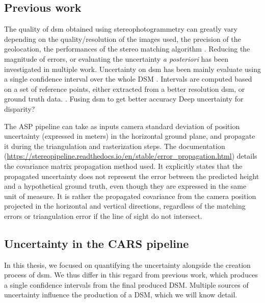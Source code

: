 \subsection{Previous work}

The quality of \acrshort{dsm} obtained using stereophotogrammetry can greatly vary depending on the quality/resolution of the images used, the precision of the geolocation, the performances of the stereo matching algorithm \etc. Reducing the magnitude of errors, or evaluating the uncertainty \textit{a posteriori} has been investigated in multiple work.
Uncertainty on \acrshort{dsm} has been mainly evaluate using a single confidence interval over the whole DSM \cite{hugonnet_uncertainty_2022, deschamps-berger_apport_2021, wang_robust_2015, oksanen_digital_2006,panagiotakis_validation_2018}. Intervals are computed based on a set of reference points, either extracted from a better resolution \acrshort{dsm}, or ground truth data. . Fusing \acrshort{dsm} to get better accuracy \cite{qin_uncertainty-guided_2022}
\cite{hu_quantitative_2012,poggi_confidence_2021}
Deep uncertainty for disparity?

The ASP pipeline can take as inputs camera standard deviation of position uncertainty (expressed in meters) in the horizontal ground plane, and propagate it during the triangulation and rasterization steps. The documentation (\url{https://stereopipeline.readthedocs.io/en/stable/error_propagation.html}) details the covariance matrix propagation method used. It explicitly states that the propagated uncertainty does not represent the error between the predicted height and a hypothetical ground truth, even though they are expressed in the same unit of measure. It is rather the propagated covariance from the camera position projected in the horizontal and vertical directions, regardless of the matching errors or triangulation error if the line of sight do not intersect.

\subsection{Uncertainty in the CARS pipeline}\label{sec:uncertainty_cars}
In this thesis, we focused on quantifying the uncertainty alongside the creation process of \acrshort{dsm}. We thus differ in this regard from previous work, which produces a single confidence intervals from the final produced DSM. Multiple sources of uncertainty influence the production of a DSM, which we will know detail.


